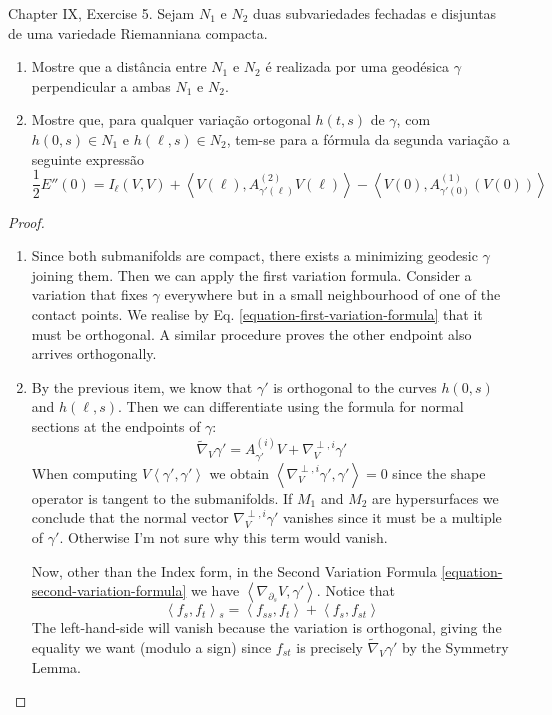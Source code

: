 \documentclass{book}
\begin{document}
\begin{exercise}
\label{exercise-two-submanifolds}
\cite{doc} Chapter IX, Exercise 5. Sejam
$N_1$ e $N_2$ duas subvariedades
 fechadas e disjuntas de uma variedade
 Riemanniana compacta.
\begin{enumerate}
\item Mostre que a distância entre $N_1$ e
$N_2$ é realizada por uma geodésica
	$\gamma$ perpendicular a ambas $N_1$ e
	$N_2$.
\item Mostre que, para qualquer variação
ortogonal $h(t,s)$ de $\gamma$, com
$h(0,s) \in N_1$ e $h(\ell,s) \in N_2$,
tem-se para a fórmula da segunda
variação a seguinte expressão
$$
\frac{1}{2}E''(0)=I_{\ell}(V,V)+
\left\langle{}V(\ell),A_{\gamma'(\ell)}^{(2)}V(\ell)
\right\rangle{}
-\left\langle{}V(0),A^{(1)}_{\gamma'(0)}(V(0))\right\rangle{}
$$
\end{enumerate}
\end{exercise}

\begin{proof}
\begin{enumerate}
\item Since both submanifolds are compact,
there exists a minimizing geodesic
$\gamma$ joining them. Then we can apply the
first variation formula. Consider a
variation that fixes $\gamma$ everywhere but
in a small neighbourhood of one of
the contact points. We realise by Eq.
\ref{equation-first-variation-formula}
that it must be orthogonal. A similar
procedure proves the other endpoint also
arrives orthogonally.

\item By the previous item, we
know that $\gamma'$ is orthogonal to the
curves $h(0,s)$ and $h(\ell,s)$. Then
we can differentiate using the formula for
normal sections at the endpoints of
$\gamma$:
$$
\tilde{\nabla}_{V}\gamma'=A^{(i)}_{\gamma'}V+
\nabla^{\perp,i}_V\gamma'
$$
When computing
$V\left\langle{}\gamma',\gamma'\right\rangle{}$ we obtain
$\left\langle{}\nabla^{\perp,i}_V\gamma',
\gamma'\right\rangle{}=0$
since the shape operator is
tangent to the submanifolds. If $M_1$ and
$M_2$ are hypersurfaces we conclude
that the normal vector
$\nabla^{\perp,i}_V\gamma'$ vanishes since it
must be a
multiple of $\gamma'$. Otherwise I'm not sure
why this term would vanish.

Now, other than the Index form, in the Second
Variation Formula
\ref{equation-second-variation-formula} we
have
$\left\langle{}\nabla_{\partial_s}V,\gamma'\right\rangle{}$.
Notice that
$$
\left\langle{}f_s,f_t\right\rangle{}_s=\left\langle{}f_{ss},
f_t\right\rangle{}+\left\langle{}f_s,f_{st}\right\rangle{}
$$
The left-hand-side will vanish because the
variation is orthogonal, giving the
equality we want (modulo a sign) since
$f_{st}$ is precisely
$\tilde{\nabla}_V\gamma'$ by the Symmetry
Lemma.
\end{enumerate}
\end{proof}
\end{document}
